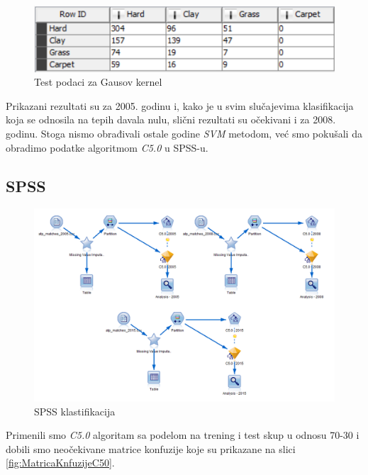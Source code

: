 \documentclass[a4paper]{article}
\begin{document}
\begin{figure}[h!]
\begin{center}
	\includegraphics[scale=0.80]{KNIME_project/SVM/rbf_test}
\end{center}
\caption{Test podaci za Gausov kernel}
\label{fig:rbf_test}
\end{figure}

Prikazani rezultati su za 2005. godinu i, kako je u svim slučajevima klasifikacija koja se odnosila na tepih davala nulu, slični rezultati su očekivani i za 2008. godinu. Stoga nismo obrađivali ostale godine \textit{SVM} metodom, već smo pokušali da obradimo podatke algoritmom \textit{C5.0} u SPSS-u.

\subsection{SPSS}

\begin{figure}[H]
	\begin{center}
		\includegraphics[scale=0.60]{Klasifikacija/C50/SPSS_C50_Surface.png}
	\end{center}
	\caption{SPSS klastifikacija}
	\label{fig:SPSS_CvoroviKlasifikacija}
\end{figure}

Primenili smo \textit{C5.0} algoritam sa podelom na trening i test skup u odnosu 70-30 i dobili smo neočekivane matrice konfuzije koje su prikazane na slici \ref{fig:MatricaKnfuzijeC50}.
\end{document}
